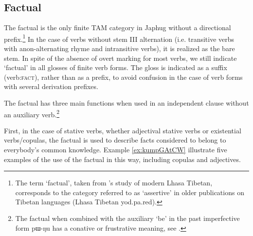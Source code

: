\documentclass[oldfontcommands,oneside,a4paper,11pt]{article}
\newcommand{\ipa}[1]{{\phon \mbox{#1}}} %
\newcommand{\factual}[1]{\textsc{:fact}}
\begin{document}
\subsection{Factual} \label{sec:fact}

The factual is the only finite TAM category in Japhug without a directional prefix.\footnote{The term `factual', taken from \citet{oisel13aux}'s study of modern Lhasa Tibetan, corresponds to the category referred to as `assertive' in older publications on Tibetan languages (Lhasa Tibetan \ipa{yod.pa.red}).} In the case of verbs without stem III alternation (i.e. transitive verbs with anon-alternating rhyme and intransitive verbs), it is realized as the bare stem. In spite of the absence of overt marking for most verbs, we still indicate `factual' in all glosses of finite verb forms. The gloss is indicated as a suffix (verb\factual{}), rather than as a prefix, to avoid confusion in the case of verb forms with several derivation prefixes.

The factual has three main functions when used in an independent clause without an auxiliary verb.\footnote{The factual when combined with the auxiliary  `be' in the past imperfective form \ipa{pɯ-ŋu} has a conative or frustrative meaning, see \citealt[292]{jacques14linking}.}

First,  in the case of stative verbs, whether adjectival stative verbs or existential verbs/copulas, the factual is used to describe facts considered to belong to everybody's common knowledge. Example \ref{ex:kumpGAtCW} illustrate five examples of the use of the factual in this way, including copulas and adjectives. 
\end{document}
